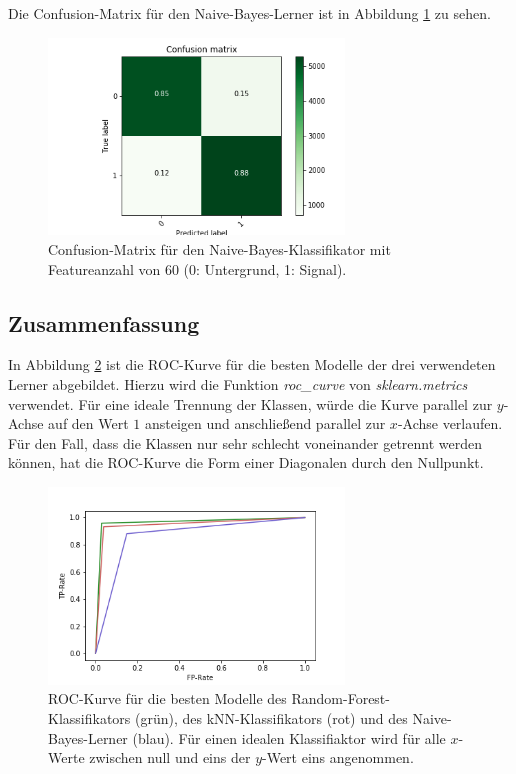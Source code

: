   \FloatBarrier 
  Die Confusion-Matrix für den Naive-Bayes-Lerner ist in Abbildung \ref{fig:NB_conf} zu sehen.
  \begin{figure}
    \centering
    \includegraphics[width=0.7\textwidth]{plots/NB_confusion.png}
    \caption{Confusion-Matrix für den Naive-Bayes-Klassifikator mit Featureanzahl von 60 (0: Untergrund, 1: Signal).}
    \label{fig:NB_conf}
  \end{figure}
  \FloatBarrier

  \subsection{Zusammenfassung}
  In Abbildung \ref{fig:roc} ist die ROC-Kurve für die besten Modelle der drei verwendeten Lerner abgebildet. Hierzu wird die Funktion \textit{roc\_curve} von \textit{sklearn.metrics} verwendet. Für eine ideale Trennung der Klassen, würde die Kurve parallel zur $y$-Achse auf den Wert $1$ ansteigen und anschließend parallel zur $x$-Achse verlaufen. Für den Fall, dass die Klassen nur sehr schlecht voneinander getrennt werden können, hat die ROC-Kurve die Form einer Diagonalen durch den Nullpunkt.
  \begin{figure}
    \centering
    \includegraphics[width=0.7\textwidth]{plots/roc_kurve.png}
    \caption{ROC-Kurve für die besten Modelle des Random-Forest-Klassifikators (grün), des kNN-Klassifikators (rot) und des Naive-Bayes-Lerner (blau). Für einen idealen Klassifiaktor wird für alle $x$- Werte zwischen null und eins der $y$-Wert eins angenommen.}
    \label{fig:roc}
  \end{figure}
  \FloatBarrier
